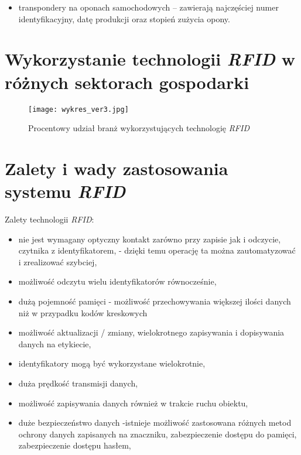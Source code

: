 \begin{itemize}
\begin{itemize}
\begin{itemize}
	\item transpondery na oponach samochodowych – zawierają najczęściej numer identyfikacyjny, datę produkcji oraz stopień zużycia opony.

\end{itemize}

\newpage
\section{Wykorzystanie technologii \emph{RFID} w różnych sektorach gospodarki}

	\begin{figure}[h!]
	\centering
	    \texttt{[image: wykres\_ver3.jpg]}
	    \caption{Procentowy udział branż wykorzystujących technologię \emph{RFID}}
	\end{figure}


\section {Zalety i wady zastosowania systemu \emph{RFID}}

Zalety technologii \emph{RFID}:

\begin{itemize}\setlength{\itemsep}{0pt}
	\item nie jest wymagany optyczny kontakt zarówno przy zapisie jak i odczycie, czytnika z identyfikatorem, - dzięki temu operację ta można zautomatyzować i zrealizować szybciej,
	
	\item możliwość odczytu wielu identyfikatorów równocześnie,
	
	\item dużą  pojemność pamięci  - możliwość przechowywania większej ilości danych niż w przypadku kodów kreskowych

	\item możliwość aktualizacji / zmiany, wielokrotnego zapisywania i dopisywania danych  na etykiecie,

	\item identyfikatory mogą być wykorzystane wielokrotnie,

	\item duża prędkość transmisji danych,

	\item możliwość zapisywania danych również w trakcie ruchu obiektu,

	\item duże bezpieczeństwo danych -istnieje możliwość zastosowana różnych metod ochrony danych zapisanych na znaczniku, zabezpieczenie dostępu do pamięci, zabezpieczenie dostępu hasłem,  


\end{itemize}
\end{itemize}
\end{itemize}
